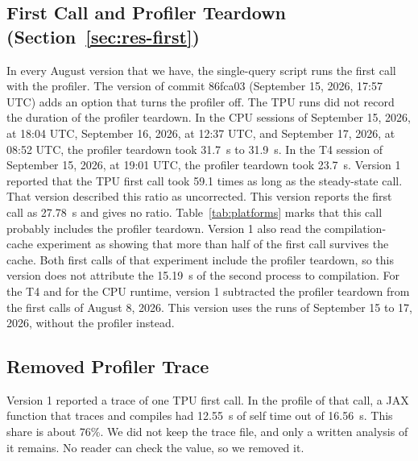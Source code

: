 \subsection*{First Call and Profiler Teardown (Section~\ref{sec:res-first})}
In every August version that we have, the single-query script runs the first call with the profiler.
The version of commit 86fca03 (September 15, 2026, 17:57 UTC) adds an option that turns the profiler off. %
 The TPU runs did not record the duration of the profiler teardown.
In the CPU sessions of September 15, 2026, at 18:04 UTC, September 16, 2026, at 12:37 UTC, and September 17, 2026, at 08:52 UTC, the profiler teardown took 31.7~s to 31.9~s. %
In the T4 session of September 15, 2026, at 19:01 UTC, the profiler teardown took 23.7~s. %
Version 1 reported that the TPU first call took 59.1 times as long as the steady-state call. That version described this ratio as uncorrected. %
This version reports the first call as 27.78~s and gives no ratio. %
Table~\ref{tab:platforms} marks that this call probably includes the profiler teardown.
Version 1 also read the compilation-cache experiment as showing that more than half of the first call survives the
cache. Both first calls of that experiment include the profiler teardown, so this version does not attribute the 15.19~s of the second process to compilation. %
For the T4 and for the CPU runtime, version 1 subtracted the profiler teardown from the first calls of August 8, 2026. %
This version uses the runs of September 15 to 17, 2026, without the profiler instead. %

\subsection*{Removed Profiler Trace}
Version 1 reported a trace of one TPU first call.
In the profile of that call, a JAX function that traces and compiles had 12.55~s of self time out of 16.56~s. This share is about 76\%. %
We did not keep the trace file, and only a written analysis of it remains. No reader can check the value, so we
removed it.


